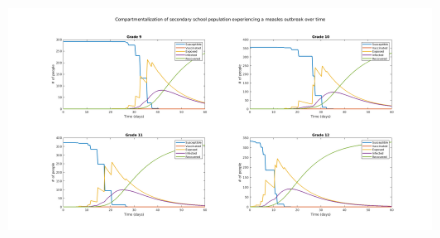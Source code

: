 \documentclass[fleqn]{article}
\begin{document}
\begin{figure}[t!]
	\vspace*{-1.5in}
	\hspace{-2.7in}
	\includegraphics[scale=0.52]{fig.png}
\end{figure}
\end{document}
